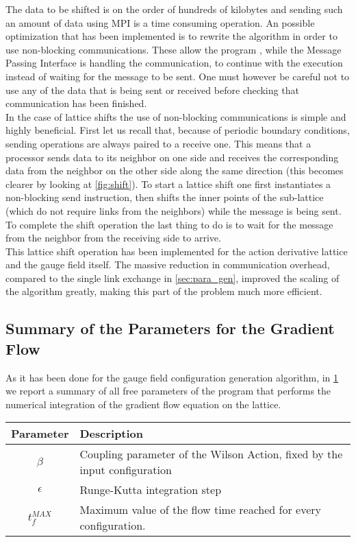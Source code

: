 The data to be shifted is on the order of hundreds of kilobytes and sending such an amount of data using MPI is a time consuming operation. An possible optimization that has been implemented is to rewrite the algorithm in order to use non-blocking communications. These allow the program , while the Message Passing Interface is handling the communication, to continue with the execution instead of waiting for the message to be sent. One must however be careful not to use any of the data that is being sent or received before checking that communication has been finished. \\
In the case of lattice shifts the use of non-blocking communications is simple and highly beneficial. 
First let us recall that, because of periodic boundary conditions, sending operations are always paired to a receive one. This means that a processor sends data to its neighbor on one side and receives the corresponding data from the neighbor on the other side along the same direction (this becomes clearer by looking at \cref{fig:shift}). To start a lattice shift one first instantiates a non-blocking send instruction, then shifts the inner points of the sub-lattice (which do not require links from the neighbors) while the message is being sent. To complete the shift operation the last thing to do is to wait for the message from the neighbor from the receiving side to arrive.\\
This lattice shift operation has been implemented for the action derivative lattice and the gauge field itself. The massive reduction in communication overhead, compared to the single link exchange in \cref{sec:para_gen}, improved the scaling of the algorithm greatly, making this part of the problem much more efficient.

\subsection{Summary of the Parameters for the Gradient Flow}
As it has been done for the gauge field configuration generation algorithm, in \cref{FLOW:params} we report a summary of all free parameters of the program that performs the numerical integration of the gradient flow equation on the lattice.

\begin{table}[!htb]
\begin{center}
\begin{tabular}{cl}
    Parameter & Description\\\hline
    $\beta$ & Coupling parameter of the Wilson Action, fixed by the input configuration\\
    $\epsilon$ & Runge-Kutta integration step\\
    $t_f^{MAX}$ & Maximum value of the flow time reached for every configuration. 
\end{tabular}
\label{FLOW:params}
\end{center}
\end{table}


